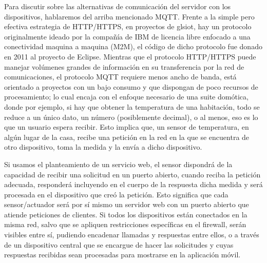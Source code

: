 Para discutir sobre las alternativas de comunicación del servidor con los dispositivos, hablaremos del arriba mencionado MQTT. Frente a la simple pero efectiva estrategia de HTTP/HTTPS, en proyectos de gls{iot}, hay un protocolo originalmente ideado por la compañía de IBM de licencia libre enfocado a una conectividad maquina a maquina (M2M), el código de dicho protocolo fue donado en 2011 al proyecto de Eclipse. Mientras que el protocolo HTTP/HTTPS puede manejar volúmenes grandes de información en su transferencia por la red de comunicaciones, el protocolo MQTT requiere menos ancho de banda, está orientado a proyectos con un bajo consumo y que dispongan de poco recursos de procesamiento; lo cual encaja con el enfoque necesario de una suite domótica, donde por ejemplo, si hay que obtener la temperatura de una habitación, todo se reduce a un único dato, un número (posiblemente decimal), o al menos, eso es lo que un usuario espera recibir. Esto implica que, un sensor de temperatura, en algún lugar de la casa, recibe una petición en la red en la que se encuentra de otro dispositivo, toma la medida y la envía a dicho dispositivo.

\vspace{1cm}

Si usamos el planteamiento de un servicio web, el sensor dispondrá de la capacidad de recibir una solicitud en un puerto abierto, cuando reciba la petición adecuada, responderá incluyendo en el cuerpo de la respuesta dicha medida y será procesada en el dispositivo que creó la petición. Esto significa que cada sensor/actuador será por sí mismo un servidor web con un puerto abierto que atiende peticiones de clientes. Si todos los dispositivos están conectados en la misma red, salvo que se apliquen restricciones específicas en el firewall, serán visibles entre sí, pudiendo encadenar llamadas y respuestas entre ellos, o a través de un dispositivo central que se encargue de hacer las solicitudes y cuyas respuestas recibidas sean procesadas para mostrarse en la aplicación móvil.


